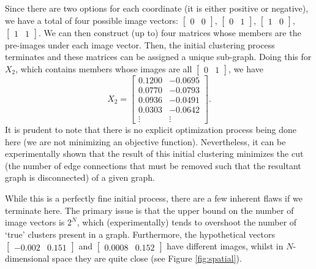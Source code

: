 \documentclass[11pt, letterpaper]{article}
\theoremstyle{perchance}
\begin{document}
        Since there are two options for each coordinate (it is either positive or negative), we have a total of four possible image vectors: $\begin{bmatrix} 0 & 0 \end{bmatrix}$, $\begin{bmatrix} 0 & 1 \end{bmatrix}$, $\begin{bmatrix} 1 & 0 \end{bmatrix}$, $\begin{bmatrix} 1 & 1 \end{bmatrix}$. We can then construct (up to) four matrices whose members are the pre-images under each image vector. Then, the initial clustering process terminates and these matrices can be assigned a unique sub-graph. Doing this for $X_2$, which contains members whose images are all $\begin{bmatrix} 0 & 1 \end{bmatrix}$, we have
        \[X_2 = \begin{bmatrix}
            0.1200 & -0.0695 \\
            0.0770 & -0.0793 \\
            0.0936 & -0.0491 \\
            0.0303 & -0.0642 \\
            \vdots & \vdots  
        \end{bmatrix}.\]
        It is prudent to note that there is no explicit optimization process being done here (we are not minimizing an objective function). Nevertheless, it can be experimentally shown that the result of this initial clustering minimizes the cut (the number of edge connections that must be removed such that the resultant graph is disconnected) of a given graph.
        
        While this is a perfectly fine initial process, there are a few inherent flaws if we terminate here. The primary issue is that the upper bound on the number of image vectors is $2^N$, which (experimentally) tends to overshoot the number of `true' clusters present in a graph. Furthermore, the hypothetical vectors $\begin{bmatrix} -0.002 & 0.151 \end{bmatrix}$ and $\begin{bmatrix} 0.0008 & 0.152 \end{bmatrix}$ have different images, whilst in $N$-dimensional space they are quite close (see Figure \ref{fig:spatial}).
        
\end{document}

